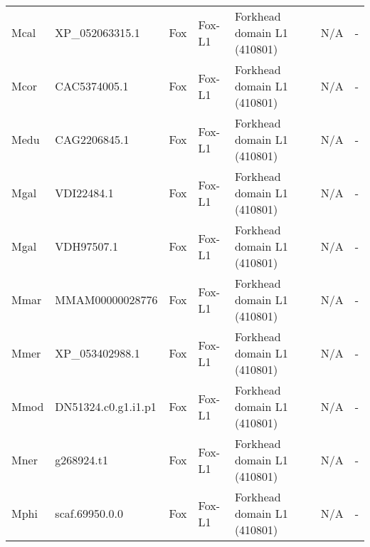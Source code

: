 \documentclass[../main.tex]{subfiles}
\begin{document}
\begin{landscape}
\begin{longtable}{lllllll}
		Mcal           & XP\_052063315.1       & Fox            & Fox-L1              & Forkhead domain L1 (410801)                 & N/A                                                                    & -                    \\
		Mcor           & CAC5374005.1          & Fox            & Fox-L1              & Forkhead domain L1 (410801)                 & N/A                                                                    & -                    \\
		Medu           & CAG2206845.1          & Fox            & Fox-L1              & Forkhead domain L1 (410801)                 & N/A                                                                    & -                    \\
		Mgal           & VDI22484.1            & Fox            & Fox-L1              & Forkhead domain L1 (410801)                 & N/A                                                                    & -                    \\
		Mgal           & VDH97507.1            & Fox            & Fox-L1              & Forkhead domain L1 (410801)                 & N/A                                                                    & -                    \\
		Mmar           & MMAM00000028776       & Fox            & Fox-L1              & Forkhead domain L1 (410801)                 & N/A                                                                    & -                    \\
		Mmer           & XP\_053402988.1       & Fox            & Fox-L1              & Forkhead domain L1 (410801)                 & N/A                                                                    & -                    \\
		Mmod           & DN51324.c0.g1.i1.p1   & Fox            & Fox-L1              & Forkhead domain L1 (410801)                 & N/A                                                                    & -                    \\
		Mner           & g268924.t1            & Fox            & Fox-L1              & Forkhead domain L1 (410801)                 & N/A                                                                    & -                    \\
		Mphi           & scaf.69950.0.0        & Fox            & Fox-L1              & Forkhead domain L1 (410801)                 & N/A                                                                    & -                    \\

\end{longtable}
\end{landscape}
\end{document}
